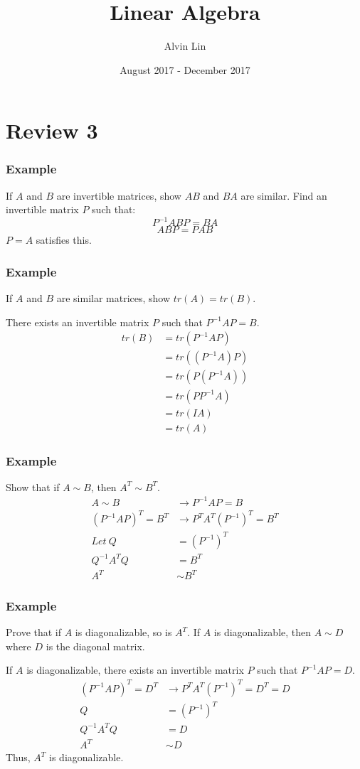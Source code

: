 \documentclass{math}
\title{Linear Algebra}
\author{Alvin Lin}
\date{August 2017 - December 2017}
\begin{document}
\maketitle

\section*{Review 3}

\subsubsection*{Example}
If \( A \) and \( B \) are invertible matrices, show \( AB \) and \( BA \) are
similar. Find an invertible matrix \( P \) such that:
\[ P^{-1}ABP = BA \]
\[ ABP = PAB \]
\( P = A \) satisfies this.

\subsubsection*{Example}
If \( A \) and \( B \) are similar matrices, show \( tr(A) = tr(B) \). \par
There exists an invertible matrix \( P \) such that \( P^{-1}AP = B \).
\begin{align*}
  tr(B) &= tr(P^{-1}AP) \\
  &= tr((P^{-1}A)P) \\
  &= tr(P(P^{-1}A)) \\
  &= tr(PP^{-1}A) \\
  &= tr(IA) \\
  &= tr(A)
\end{align*}

\subsubsection*{Example}
Show that if \( A\sim B \), then \( A^T\sim B^T \).
\begin{align*}
  A\sim B &\to P^{-1}AP = B \\
  (P^{-1}AP)^T = B^T &\to P^TA^T(P^{-1})^T = B^T \\
  Let~Q &= (P^{-1})^T \\
  Q^{-1}A^TQ &= B^T \\
  A^T &\sim B^T
\end{align*}

\subsubsection*{Example}
Prove that if \( A \) is diagonalizable, so is \( A^T \). If \( A \) is
diagonalizable, then \( A\sim D \) where \( D \) is the diagonal matrix.
\par
If \( A \) is diagonalizable, there exists an invertible matrix \( P \) such
that \( P^{-1}AP = D \).
\begin{align*}
  (P^{-1}AP)^T = D^T &\to P^TA^T(P^{-1})^T = D^T = D \\
  Q &= (P^{-1})^T \\
  Q^{-1}A^TQ &= D \\
  A^T &\sim D
\end{align*}
Thus, \( A^T \) is diagonalizable.
\end{document}
